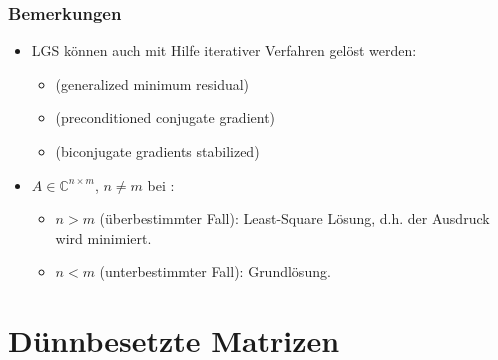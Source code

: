 \documentclass[hyperref={xetex}]{beamer}
\begin{document}
% 
%
\begin{frame}[fragile]\frametitle{Bemerkungen}
\begin{itemize}
\item LGS können auch mit Hilfe iterativer Verfahren gelöst werden:
\begin{itemize}
 \item {} (generalized minimum residual)
 \item {} (preconditioned conjugate gradient)
 \item {} (biconjugate gradients stabilized)
\end{itemize}
\item $A\in \mathbb{C}^{n \times m}$, $n \neq m$ bei :
\begin{itemize}
\item $n>m$ (überbestimmter Fall): Least-Square Lösung, d.h. der Ausdruck
   wird minimiert. 
\item $n<m$ (unterbestimmter Fall): Grundlösung. 
\end{itemize}
\end{itemize}
\end{frame}


\section{D\"unnbesetzte Matrizen}
\end{document}
